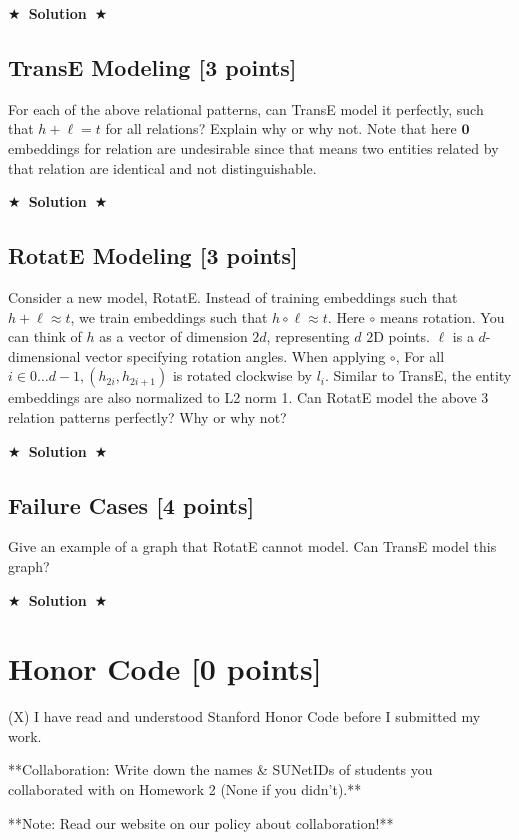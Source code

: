 \documentclass{article}
\numberwithin{figure}{section}
\newcommand{\Solution}[1]{%
    {%
        \medskip
        \color{red}
        \bf $\bigstar$~\sf\textbf{Solution}~$\bigstar$ \sf
        #1
    }
    \bigskip
}
\begin{document}
\Solution{}

\subsection{TransE Modeling [3 points]}
For each of the above relational patterns, can TransE model it perfectly, such that $h+\ell=t$ for all relations? Explain why or why not. Note that here $\mathbf{0}$ embeddings for relation are undesirable since that means two entities related by that relation are identical and not distinguishable.

\Solution{}

\subsection{RotatE Modeling [3 points]}
Consider a new model, RotatE. Instead of training embeddings such that $h+\ell \approx t$, we train embeddings such that $h \circ \ell \approx t$. Here $\circ$ means rotation. You can think of $h$ as a vector of dimension $2 d$, representing $d$ $2 \mathrm{D}$ points. $\ell$ is a $d$-dimensional vector specifying rotation angles. When applying $\circ$, For all $i \in 0 \ldots d-1, \left(h_{2 i}, h_{2 i+1}\right)$ is rotated clockwise by $l_i$. Similar to TransE, the entity embeddings are also normalized to L2 norm 1. Can RotatE model the above 3 relation patterns perfectly? Why or why not?

\Solution{}

\subsection{Failure Cases [4 points]}
Give an example of a graph that RotatE cannot model. Can TransE model this graph?

\Solution{}


\section{Honor Code [0 points]}
(X) I have read and understood Stanford Honor Code before I submitted my
work.

**Collaboration: Write down the names \& SUNetIDs of students you collaborated with on Homework 2 (None if you didn’t).**

**Note: Read our website on our policy about collaboration!**
\end{document}
